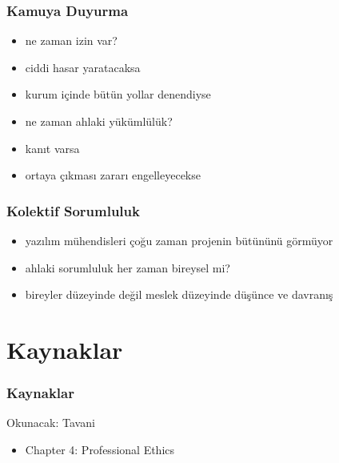 \documentclass[dvipsnames]{beamer}
\theoremstyle{plain}
\begin{document}
\begin{frame}
  \frametitle{Kamuya Duyurma}

  \begin{itemize}
    \item ne zaman izin var?
    \smallskip
    \item ciddi hasar yaratacaksa
    \item kurum içinde bütün yollar denendiyse

    \pause
    \bigskip
    \item ne zaman ahlaki yükümlülük?
    \smallskip
    \item kanıt varsa
    \item ortaya çıkması zararı engelleyecekse
  \end{itemize}
\end{frame}

\begin{frame}
  \frametitle{Kolektif Sorumluluk}

  \begin{itemize}
    \item yazılım mühendisleri çoğu zaman projenin bütününü görmüyor
    \item ahlaki sorumluluk her zaman bireysel mi?

    \pause
    \medskip
    \item bireyler düzeyinde değil meslek düzeyinde düşünce ve davranış
  \end{itemize}
\end{frame}

\section*{Kaynaklar}

\begin{frame}
  \frametitle{Kaynaklar}

  \begin{block}{Okunacak: Tavani}
    \begin{itemize}
      \item Chapter 4: \alert{Professional Ethics}
    \end{itemize}
  \end{block}
\end{frame}
\end{document}
